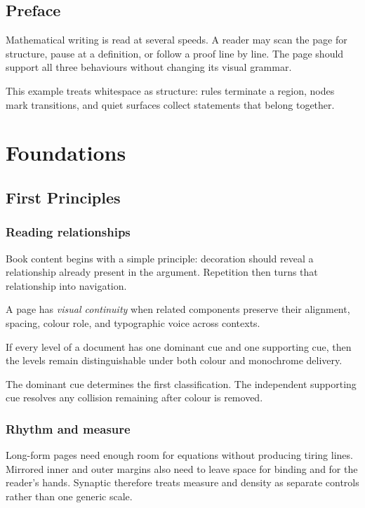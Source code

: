 \documentclass[11pt,twoside]{scrbook}
\begin{document}
\SynapticMakeTitle
\SynapticFrontMatter
\chapter{Preface}
Mathematical writing is read at several speeds. A reader may scan the page for
structure, pause at a definition, or follow a proof line by line. The page
should support all three behaviours without changing its visual grammar.

This example treats whitespace as structure: rules terminate a region, nodes
mark transitions, and quiet surfaces collect statements that belong together.
\SynapticBookContents
\SynapticMainMatter
\part{Foundations}
\chapter{First Principles}
\section{Reading relationships}
Book content begins with a simple principle: decoration should reveal a
relationship already present in the argument. Repetition then turns that
relationship into navigation.

\begin{syndefinition}
  A page has \emph{visual continuity} when related components preserve their
  alignment, spacing, colour role, and typographic voice across contexts.
\end{syndefinition}

\begin{syntheorem}
  If every level of a document has one dominant cue and one supporting cue,
  then the levels remain distinguishable under both colour and monochrome
  delivery.
\end{syntheorem}
\begin{synproof}
  The dominant cue determines the first classification. The independent
  supporting cue resolves any collision remaining after colour is removed.
\end{synproof}

\section{Rhythm and measure}
Long-form pages need enough room for equations without producing tiring lines.
Mirrored inner and outer margins also need to leave space for binding and for
the reader's hands. Synaptic therefore treats measure and density as separate
controls rather than one generic scale.
\end{document}
